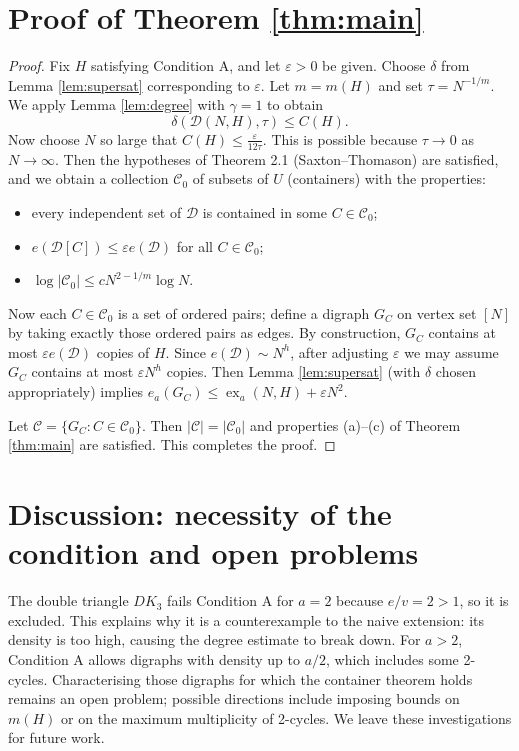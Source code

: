 \documentclass[11pt,a4paper]{article}
\DeclareMathOperator{\ex}{ex}
\newcommand{\cC}{\mathcal{C}}
\newcommand{\cD}{\mathcal{D}}
\newcommand{\eps}{\varepsilon}
\newcommand{\del}{\delta}
\begin{document}
\section{Proof of Theorem \ref{thm:main}}
\begin{proof}
Fix $H$ satisfying Condition A, and let $\eps>0$ be given. Choose $\del$ from Lemma \ref{lem:supersat} corresponding to $\eps$. Let $m=m(H)$ and set $\tau = N^{-1/m}$. We apply Lemma \ref{lem:degree} with $\gamma=1$ to obtain
\[
\delta(\cD(N,H),\tau)\le C(H).
\]
Now choose $N$ so large that $C(H)\le \frac{\eps}{12\tau}$. This is possible because $\tau\to0$ as $N\to\infty$. Then the hypotheses of Theorem 2.1 (Saxton–Thomason) are satisfied, and we obtain a collection $\cC_0$ of subsets of $U$ (containers) with the properties:
\begin{itemize}
\item every independent set of $\cD$ is contained in some $C\in\cC_0$;
\item $e(\cD[C])\le \eps e(\cD)$ for all $C\in\cC_0$;
\item $\log|\cC_0|\le c N^{2-1/m}\log N$.
\end{itemize}

Now each $C\in\cC_0$ is a set of ordered pairs; define a digraph $G_C$ on vertex set $[N]$ by taking exactly those ordered pairs as edges. By construction, $G_C$ contains at most $\eps e(\cD)$ copies of $H$. Since $e(\cD)\sim N^h$, after adjusting $\eps$ we may assume $G_C$ contains at most $\eps N^h$ copies. Then Lemma \ref{lem:supersat} (with $\del$ chosen appropriately) implies $e_a(G_C)\le \ex_a(N,H)+\eps N^2$.

Let $\cC=\{G_C:C\in\cC_0\}$. Then $|\cC|=|\cC_0|$ and properties (a)–(c) of Theorem \ref{thm:main} are satisfied. This completes the proof.
\end{proof}

\section{Discussion: necessity of the condition and open problems}

The double triangle $DK_3$ fails Condition A for $a=2$ because $e/v=2>1$, so it is excluded. This explains why it is a counterexample to the naive extension: its density is too high, causing the degree estimate to break down. For $a>2$, Condition A allows digraphs with density up to $a/2$, which includes some 2-cycles. Characterising those digraphs for which the container theorem holds remains an open problem; possible directions include imposing bounds on $m(H)$ or on the maximum multiplicity of 2-cycles. We leave these investigations for future work.
\end{document}
